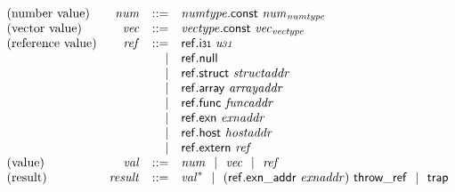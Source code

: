 \vspace{1ex}

$$
\begin{array}[t]{@{}lrrl@{}l@{}}
\mbox{(number value)} & {\mathit{num}} & ::= & {\mathit{numtype}}{.}\mathsf{const}~{{\mathit{num}}}_{{\mathit{numtype}}} \\
\mbox{(vector value)} & {\mathit{vec}} & ::= & {\mathit{vectype}}{.}\mathsf{const}~{{\mathit{vec}}}_{{\mathit{vectype}}} \\
\mbox{(reference value)} & {\mathit{ref}} & ::= & \mathsf{ref{.}i{\scriptstyle 31}}~{\mathit{u{\kern-0.1em\scriptstyle 31}}} \\
& & | & \mathsf{ref{.}null} \\
& & | & \mathsf{ref{.}struct}~{\mathit{structaddr}} \\
& & | & \mathsf{ref{.}array}~{\mathit{arrayaddr}} \\
& & | & \mathsf{ref{.}func}~{\mathit{funcaddr}} \\
& & | & \mathsf{ref{.}exn}~{\mathit{exnaddr}} \\
& & | & \mathsf{ref{.}host}~{\mathit{hostaddr}} \\
& & | & \mathsf{ref{.}extern}~{\mathit{ref}} \\
\mbox{(value)} & {\mathit{val}} & ::= & {\mathit{num}} ~~|~~ {\mathit{vec}} ~~|~~ {\mathit{ref}} \\
\mbox{(result)} & {\mathit{result}} & ::= & {{\mathit{val}}^\ast} ~~|~~ ( \mathsf{ref{.}exn\_addr}~{\mathit{exnaddr}} )~\mathsf{throw\_ref} ~~|~~ \mathsf{trap} \\
\end{array}
$$

\vspace{1ex}

